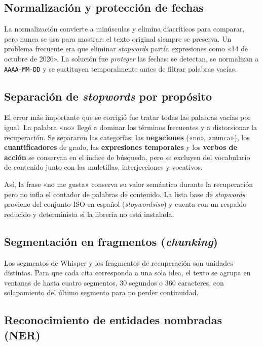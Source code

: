 \documentclass[12pt,a4paper]{article}
\begin{document}
\subsection{Normalización y protección de fechas}

La normalización convierte a minúsculas y elimina diacríticos para comparar, pero nunca se usa para mostrar: el texto original siempre se preserva. Un problema frecuente era que eliminar \emph{stopwords} partía expresiones como «14 de octubre de 2026». La solución fue \emph{proteger} las fechas: se detectan, se normalizan a \texttt{AAAA-MM-DD} y se sustituyen temporalmente antes de filtrar palabras vacías.


\subsection{Separación de \emph{stopwords} por propósito}

El error más importante que se corrigió fue tratar todas las palabras vacías por igual. La palabra «no» llegó a dominar los términos frecuentes y a distorsionar la recuperación. Se separaron las categorías: las \textbf{negaciones} («no», «nunca»), los \textbf{cuantificadores} de grado, las \textbf{expresiones temporales} y los \textbf{verbos de acción} se conservan en el índice de búsqueda, pero se excluyen del vocabulario de contenido junto con las muletillas, interjecciones y vocativos.


Así, la frase «no me gusta» conserva su valor semántico durante la recuperación pero no infla el contador de palabras de contenido. La lista base de \emph{stopwords} proviene del conjunto ISO en español (\emph{stopwordsiso}) y cuenta con un respaldo reducido y determinista si la librería no está instalada.

\subsection{Segmentación en fragmentos (\emph{chunking})}

Los segmentos de Whisper y los fragmentos de recuperación son unidades distintas. Para que cada cita corresponda a una sola idea, el texto se agrupa en ventanas de hasta cuatro segmentos, 30 segundos o 360 caracteres, con solapamiento del último segmento para no perder continuidad.


\subsection{Reconocimiento de entidades nombradas (NER)}
\end{document}
